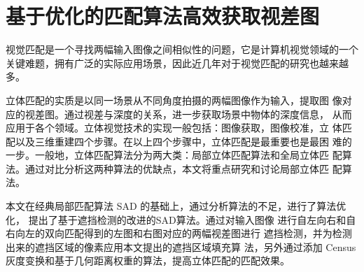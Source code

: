 
\chapter{基于优化的匹配算法高效获取视差图}

视觉匹配是一个寻找两幅输入图像之间相似性的问题，它是计算机视觉领域的一个关键难题，拥有广泛的实际应用场景，因此近几年对于视觉匹配的研究也越来越多。

立体匹配的实质是以同一场景从不同角度拍摄的两幅图像作为输入，提取图
像对应的视差图。通过视差与深度的关系，进一步获取场景中物体的深度信息，
从而应用于各个领域。立体视觉技术的实现一般包括：图像获取，图像校准，立
体匹配以及三维重建四个步骤。在以上四个步骤中，立体匹配是最重要也是最困
难的一步。一般地，立体匹配算法分为两大类：局部立体匹配算法和全局立体匹
配算法。通过对比分析这两种算法的优缺点，本文将重点研究和讨论局部立体匹
配算法。

本文在经典局部匹配算法 SAD 的基础上，通过分析算法的不足，进行了算法优化，
提出了基于遮挡检测的改进的SAD算法。通过对输入图像
进行自左向右和自右向左的双向匹配得到的左图和右图对应的两幅视差图进行
遮挡检测，并为检测出来的遮挡区域的像素应用本文提出的遮挡区域填充算
法，另外通过添加 Census 灰度变换和基于几何距离权重的算法，提高立体匹配的匹配效果。
